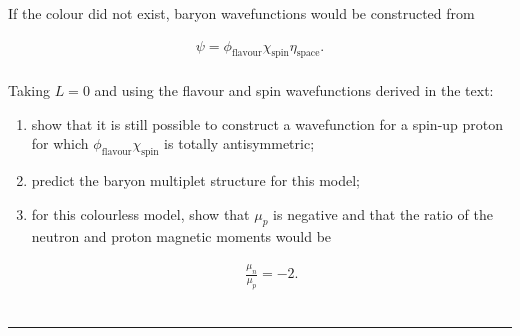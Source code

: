 
\begin{problem}{9.10}
If the colour did not exist, baryon wavefunctions would be constructed from

\begin{align*}
    \psi = \phi_\text{flavour} \chi_\text{spin} \eta_\text{space} .
\end{align*}\\
Taking $L = 0$ and using the flavour and spin wavefunctions derived in the text:

\begin{enumerate}[label=(\alph*)]
    \item show that it is still possible to construct a wavefunction for a spin-up proton for which $\phi_\text{flavour} \chi_\text{spin}$ is totally antisymmetric;
    \item predict the baryon multiplet structure for this model;
    \item for this colourless model, show that $\mu_p$ is negative and that the ratio of the neutron and proton magnetic moments would be
    
    \begin{align*}
        \frac{\mu_n}{\mu_p} = -2 .
    \end{align*}\\
\end{enumerate}
\end{problem}
\begin{solution}

\end{solution}

\noindent\rule{7in}{1.5pt}

